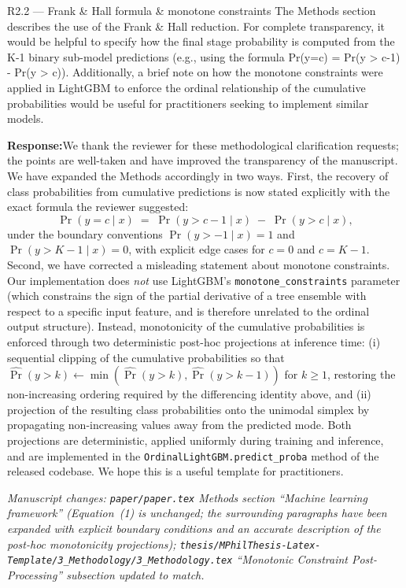 \documentclass[11pt,a4paper]{article}
\newcommand{\response}[1]{%
  \par\vspace{2pt}\noindent\textbf{\textcolor{respcolor}{Response:}}\;\;#1\par\vspace{6pt}}
\newcommand{\changeloc}[1]{\par\noindent\textit{\small Manuscript changes: #1}\par}
\begin{document}
\begin{reviewerbox}{R2.2 — Frank \& Hall formula \& monotone constraints}
The Methods section describes the use of the Frank \& Hall reduction. For
complete transparency, it would be helpful to specify how the final stage
probability is computed from the K-1 binary sub-model predictions (e.g.,
using the formula Pr(y=c) = Pr(y > c-1) - Pr(y > c)). Additionally, a brief
note on how the monotone constraints were applied in LightGBM to enforce the
ordinal relationship of the cumulative probabilities would be useful for
practitioners seeking to implement similar models.
\end{reviewerbox}

\response{We thank the reviewer for these methodological clarification
requests; the points are well-taken and have improved the transparency of
the manuscript. We have expanded the Methods accordingly in two ways.
First, the recovery of class probabilities from cumulative predictions is
now stated explicitly with the exact formula the reviewer suggested:
\[
\Pr(y = c \mid x) \;=\; \Pr(y > c-1 \mid x) \;-\; \Pr(y > c \mid x),
\]
under the boundary conventions $\Pr(y > -1 \mid x) = 1$ and
$\Pr(y > K{-}1 \mid x) = 0$, with explicit edge cases for $c=0$ and
$c=K-1$. Second, we have corrected a misleading statement about monotone
constraints. Our implementation does \emph{not} use LightGBM's
\texttt{monotone\_constraints} parameter (which constrains the sign of
the partial derivative of a tree ensemble with respect to a specific
input feature, and is therefore unrelated to the ordinal output
structure). Instead, monotonicity of the cumulative probabilities is
enforced through two deterministic post-hoc projections at inference
time: (i) sequential clipping of the cumulative probabilities so that
$\widehat{\Pr}(y > k) \leftarrow \min(\widehat{\Pr}(y > k),
\widehat{\Pr}(y > k-1))$ for $k \geq 1$, restoring the non-increasing
ordering required by the differencing identity above, and (ii)
projection of the resulting class probabilities onto the unimodal
simplex by propagating non-increasing values away from the predicted
mode. Both projections are deterministic, applied uniformly during
training and inference, and are implemented in the
\texttt{OrdinalLightGBM.predict\_proba} method of the released codebase.
We hope this is a useful template for practitioners.}
\changeloc{\texttt{paper/paper.tex} Methods section ``Machine learning
framework'' (Equation~(1) is unchanged; the surrounding paragraphs have
been expanded with explicit boundary conditions and an accurate
description of the post-hoc monotonicity projections);
\texttt{thesis/MPhilThesis-Latex-Template/3\_Methodology/3\_Methodology.tex}
``Monotonic Constraint Post-Processing'' subsection updated to match.}
\end{document}
